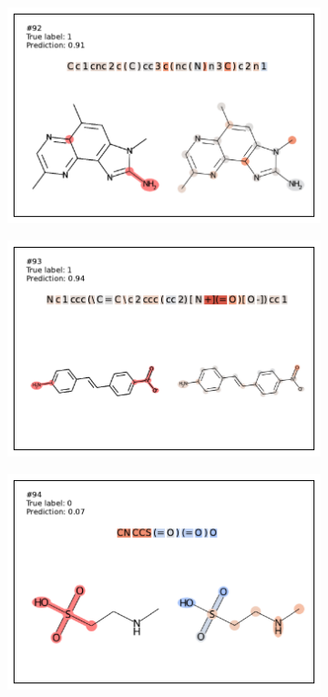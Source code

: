 \begin{figure}
\begin{subfigure}[b]{0.33\textwidth}
  \includegraphics[width=\textwidth]{figures/ames/ames92.pdf} 
\end{subfigure} 
\begin{subfigure}[b]{0.33\textwidth} 
  \centering 
  \includegraphics[width=\textwidth]{figures/ames/ames93.pdf} 
\end{subfigure}\begin{subfigure}[b]{0.33\textwidth} 
  \centering 
  \includegraphics[width=\textwidth]{figures/ames/ames94.pdf} 

\end{subfigure}
\end{figure}
